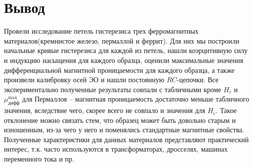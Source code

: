 \section{Вывод}
Провели исследование петель гистерезиса трех ферромагнитных материалов(кремнистое железо, пермаллой и феррит). Для них мы построили начальные кривые гистерезиса для каждой из петель, нашли коэрцитивную силу и индукцию насыщения для каждого образца, оценили максимальные значения дифференциальной магнитной проницаемости для каждого образца, а также произвели калибровку осей ЭО и нашли постоянную $RC$-цепочки. Все экспериментально полученные результаты совпали с табличными кроме $H_c$ и $\mu_{\text{дифф}}^{\max}$ для Пермаллоя -- магнитная проницаемость достаточно меньше  табличного значения, вследствие чего, скорее всего не совпало и значения для $H_c$. Такое отклонение можно связать стем, что образец может быть довольно старым и изношенным, из-за чего у него и поменялись стандартные магнитные свойства. Полученные характеристики для данных материалов представляют практический интерес, т.к. часто используются в трансформаторах, дросселях, машинах переменного тока и пр.
